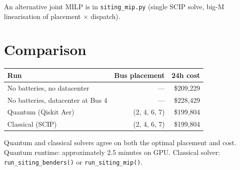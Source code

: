 \documentclass[11pt]{article}
\begin{document}
An alternative joint MILP is in \texttt{siting\_mip.py} (single SCIP solve, big-M linearisation of placement $\times$ dispatch).

\section{Comparison}

\begin{center}
\begin{tabular}{lrr}
\toprule
Run & Bus placement & 24h cost \\
\midrule
No batteries, no datacenter & --- & \$209,229 \\
No batteries, datacenter at Bus 4 & --- & \$228,429 \\
Quantum (Qiskit Aer) & (2, 4, 6, 7) & \$199,804 \\
Classical (SCIP) & (2, 4, 6, 7) & \$199,804 \\
\bottomrule
\end{tabular}
\end{center}

\noindent Quantum and classical solvers agree on both the optimal placement and cost. Quantum runtime: approximately 2.5 minutes on GPU. Classical solver: \texttt{run\_siting\_benders()} or \texttt{run\_siting\_mip()}.
\end{document}
